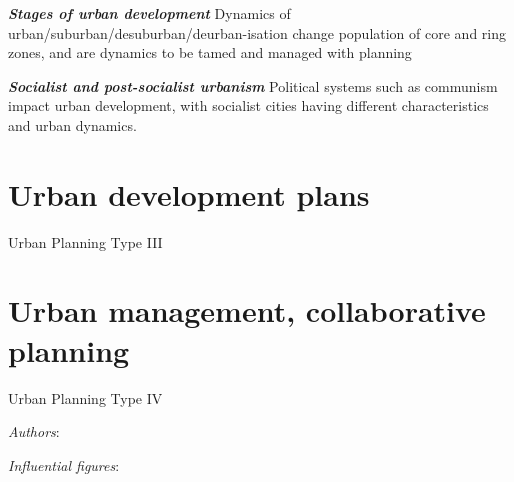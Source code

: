 \documentclass{article}
\newcommand{\bisection}[1]{\textbf{\textit{#1}}}
\begin{document}
\bisection{Stages of urban development} Dynamics of urban/suburban/desuburban/deurban-isation change population of core and ring zones, and are dynamics to be tamed and managed with planning

\bisection{Socialist and post-socialist urbanism} Political systems such as communism impact urban development, with socialist cities having different characteristics and urban dynamics.

\pagebreak
\section{Urban development plans}

Urban Planning Type III 

\bisection{}

\bisection{}

\bisection{}

\bisection{}

\bisection{}

\bisection{}

\bisection{}

\bisection{}

\bisection{}

\bisection{}

\bisection{}



\pagebreak
\section{Urban management, collaborative planning}

Urban Planning Type IV

\textit{Authors}:

\textit{Influential figures}:


\bisection{}

\bisection{}

\bisection{}

\bisection{}

\bisection{}

\bisection{}

\bisection{}

\bisection{}

\bisection{}

\bisection{}

\bisection{}
\end{document}
